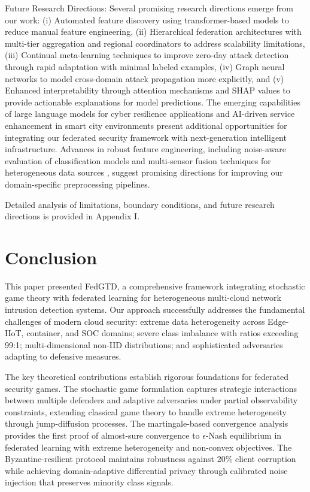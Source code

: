 \documentclass[12pt,a4paper]{article}
\newcommand{\rev}[1]{\textcolor{revcolor}{#1}}
\theoremstyle{definition}
\begin{document}
Future Research Directions: Several promising research directions emerge from our work: (i) Automated feature discovery using transformer-based models to reduce manual feature engineering, (ii) Hierarchical federation architectures with multi-tier aggregation and regional coordinators to address scalability limitations, (iii) Continual meta-learning techniques to improve zero-day attack detection through rapid adaptation with minimal labeled examples, (iv) Graph neural networks to model cross-domain attack propagation more explicitly, and (v) Enhanced interpretability through attention mechanisms and SHAP values to provide actionable explanations for model predictions. \rev{The emerging capabilities of large language models for cyber resilience applications \cite{ding2025llm} and AI-driven service enhancement in smart city environments \cite{sallam2025robust} present additional opportunities for integrating our federated security framework with next-generation intelligent infrastructure. Advances in robust feature engineering, including noise-aware evaluation of classification models \cite{aggarwal2025performance} and multi-sensor fusion techniques for heterogeneous data sources \cite{kumar2025gnss,aggarwal2025cv}, suggest promising directions for improving our domain-specific preprocessing pipelines.}

Detailed analysis of limitations, boundary conditions, and future research directions is provided in Appendix I.

\section{Conclusion}

This paper presented FedGTD, a comprehensive framework integrating stochastic game theory with federated learning for heterogeneous multi-cloud network intrusion detection systems. Our approach successfully addresses the fundamental challenges of modern cloud security: extreme data heterogeneity across Edge-IIoT, container, and SOC domains; severe class imbalance with ratios exceeding 99:1; multi-dimensional non-IID distributions; and sophisticated adversaries adapting to defensive measures.

The key theoretical contributions establish rigorous foundations for federated security games. The stochastic game formulation captures strategic interactions between multiple defenders and adaptive adversaries under partial observability constraints, extending classical game theory to handle extreme heterogeneity through jump-diffusion processes. The martingale-based convergence analysis provides the first proof of almost-sure convergence to $\epsilon$-Nash equilibrium in federated learning with extreme heterogeneity and non-convex objectives. The Byzantine-resilient protocol maintains robustness against 20\% client corruption while achieving domain-adaptive differential privacy through calibrated noise injection that preserves minority class signals.
\end{document}
